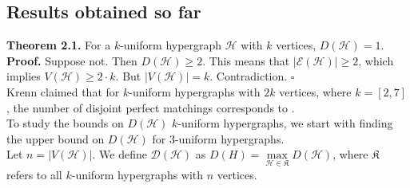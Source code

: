 \documentclass[11pt]{article}
\begin{document}
\subsection*{Results obtained so far}
\textbf{Theorem 2.1.} For a $k$-uniform hypergraph $\mathcal{H}$ with $k$ vertices, $D(\mathcal{H})=1$.\\
\textbf{Proof.} Suppose not. Then $D(\mathcal{H}) \ge 2$. This means that $|\mathcal{E}(\mathcal{H})| \ge 2$, which implies $V(\mathcal{H}) \ge 2 \cdot k$. But $|V(\mathcal{H})|=k$. Contradiction. $\square$ \medskip\\
Krenn claimed \cite{krenn_hypergraph} that for $k$-uniform hypergraphs with $2k$ vertices, where $k=[2,7]$, the number of disjoint perfect matchings corresponds to \cite{oeis1}.\medskip\\
To study the bounds on $D(\mathcal{H})$ $k$-uniform hypergraphs, we start with finding the upper bound on $D(\mathcal{H})$ for $3$-uniform hypergraphs.\\
Let $n=|V(\mathcal{H})|$. We define $\mathcal{D}(\mathcal{H})$ as $D(H)=\max\limits_{\mathcal{H} \in \mathfrak{K}} D(\mathcal{H})$, where $\mathfrak{K}$ refers to all $k$-uniform hypergraphs with $n$ vertices.
\end{document}

